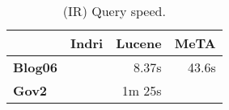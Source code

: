 \begin{table}[t]
\centering
{\small
\begin{tabular}{|l|r|r|r|}
    \hline & \textbf{Indri} & \textbf{Lucene} & \textbf{MeTA} \\
    \hline
    \textbf{Blog06} & & 8.37s & 43.6s \\
    \textbf{Gov2} & & 1m 25s & \\
    \hline
\end{tabular}
\caption{(IR) Query speed.}
\label{table:ir-query-speed}
}
\end{table}
